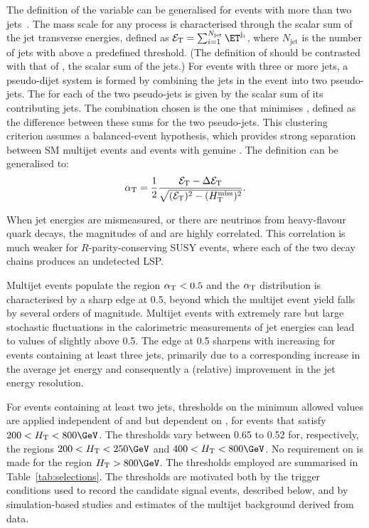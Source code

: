 The definition of the \alphat variable can be generalised for events
with more than two jets~\cite{RA1Paper}. The mass scale for any
process is characterised through the scalar sum of the jet transverse
energies, defined as $\scalst = \sum_{i=1}^{N_\text{jet}}
\ET^{\mathrm{j}_i}$, where $N_\text{jet}$ is the number of jets with
\ET above a predefined threshold. (The definition of \scalst should be
contrasted with that of \scalht, the scalar \pt sum of the jets.)
For events with three or more jets, a pseudo-dijet system is formed by
combining the jets in the event into two pseudo-jets. The \scalst for
each of the two pseudo-jets is given by the scalar \ET sum of its
contributing jets. The combination chosen is the one that minimises
\dst, defined as the difference between these sums for the two
pseudo-jets.  This clustering criterion assumes a balanced-event
hypothesis, which provides strong separation between SM multijet
events and events with genuine \ptvecmiss. The \alphat definition can
be generalised to:
\begin{equation}
  \label{eq:alphat}
  \alpha_{\mathrm{T}} = \frac{1}{2} \frac{\mathcal{E}_\mathrm{T} -
    \Delta\mathcal{E}_\mathrm{T}}{\sqrt{(\mathcal{E}_\mathrm{T})^2 - (H_{\mathrm{T}}^{\text{miss}})^2}}.
\end{equation}

When jet energies are mismeasured, or there are neutrinos from
heavy-flavour quark decays, the magnitudes of \HTmiss and \dst are
highly correlated. This correlation is much weaker for
$R$-parity-conserving SUSY events, where each of the two decay chains
produces an undetected LSP.

Multijet events populate the region $\alpha_{\mathrm{T}}< 0.5$ and the $\alpha_{\mathrm{T}}$
distribution is characterised by a sharp edge at 0.5, beyond which the
multijet event yield falls by several orders of magnitude. Multijet
events with extremely rare but large stochastic fluctuations in the
calorimetric measurements of jet energies can lead to values of
\alphat slightly above 0.5. The edge at 0.5 sharpens with increasing
\scalht for events containing at least three jets, primarily due to a
corresponding increase in the average jet energy and consequently a
(relative) improvement in the jet energy resolution.

For events containing at least two jets, thresholds on the minimum
allowed \alphat values are applied independent of \njet and \nb but
dependent on \scalht, for events that satisfy $200 < \scalht <
800\GeV$. The \alphat thresholds vary between 0.65 to 0.52 for,
respectively, the regions $200 < \scalht < 250\GeV$ and $400 < \scalht
< 800\GeV$. No requirement on \alphat is made for the region $\scalht
> 800\GeV$. The thresholds employed are summarised in
Table~\ref{tab:selections}. The \alphat thresholds are motivated both
by the trigger conditions used to record the candidate signal events,
described below, and by simulation-based studies and estimates of the
multijet background derived from data.

